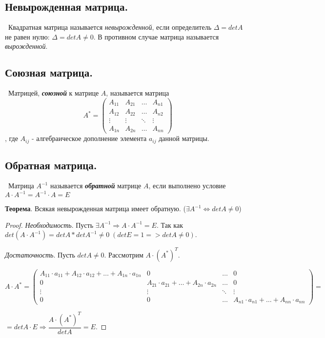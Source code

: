 \subsection*{Невырожденная матрица.}

\noindent \textasteriskcentered~Квадратная матрица называется \textit{невырожденной}, если определитель $\Delta = det A$ не равен нулю: $\Delta = det A \neq 0$. В противном случае матрица называется \textit{вырожденной}.

\subsection*{Союзная матрица.}

\noindent \textasteriskcentered~Матрицей, \textbf{\textit{союзной}} к матрице $A$, называется матрица 
\[
    A^* = 
    \begin{pmatrix}
        A_{11} & A_{21} & \dots & A_{n1} \\
        A_{12} & A_{22} & \dots & A_{n2} \\
        \vdots & \vdots &\ddots & \vdots \\
        A_{1n} & A_{2n} & \dots & A_{nn}
    \end{pmatrix}
\]
, где $A_{ij}$ - алгебраическое дополнение элемента $a_{ij}$ данной матрицы.

\subsection*{Обратная матрица.}

\noindent \textasteriskcentered~Матрица $A^{-1}$ называется \textbf{\textit{обратной}} матрице $A$, если выполнено условие $A \cdot A^{-1} = A^{-1} \cdot A = E$

\bigskip
\noindent \textbf{Теорема}. Всякая невырожденная матрица имеет обратную. ($\exists A^{-1} \Longleftrightarrow detA \neq 0$)

\begin{proof}
\par \noindent \textit{Необходимость}. Пусть $\exists A^{-1} \Rightarrow A \cdot A^{-1} = E$. Так как $det(A \cdot A^{-1}) = det A * det A^{-1} \neq 0 \; (det E = 1 => det A \neq 0)$.

\smallskip
\noindent\textit{Достаточность}. Пусть $det A \neq 0$. Рассмотрим $A \cdot (A^{*})^T$.

\[
   A \cdot A^{*} = 
   \begin{pmatrix}
        A_{11} \cdot a_{11} + A_{12} \cdot a_{12} + \dots + A_{1n} \cdot a_{1n} & 
        0 & \dots & 0 \\ 
        0 & A_{21} \cdot a_{21} + \dots + A_{2n} \cdot a_{2n} &
        \dots & 0 \\ 
        \vdots & \vdots & \ddots & \vdots \\
        0 & 0 & \dots & 
        A_{n1} \cdot a_{n1} + \dots + A_{nn} \cdot a_{nn}  
   \end{pmatrix} = 
\]

$= det A \cdot E \Rightarrow \dfrac{A \cdot (A^*)^T}{det A} = E$.

\end{proof}